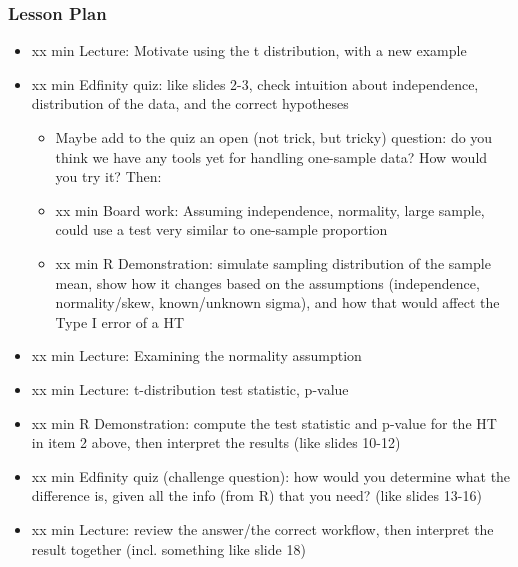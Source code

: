 \begin{frame}
    \frametitle{Lesson Plan}
    \begin{itemize}
        \item xx min Lecture: Motivate using the t distribution, with a new example
        \item xx min Edfinity quiz: like slides 2-3, check intuition about independence, distribution of the data, and the correct hypotheses
        \begin{itemize} 
            \item Maybe add to the quiz an open (not trick, but tricky) question: do you think we have any tools yet for handling one-sample data? How would you try it? Then:
            \item xx min Board work: Assuming independence, normality, large sample, could use a test very similar to one-sample proportion
            \item xx min R Demonstration: simulate sampling distribution of the sample mean, show how it changes based on the assumptions (independence, normality/skew, known/unknown sigma), and how that would affect the Type I error of a HT
        \end{itemize}
        \item xx min Lecture: Examining the normality assumption
        \item xx min Lecture: t-distribution test statistic, p-value
        \item xx min R Demonstration: compute the test statistic and p-value for the HT in item 2 above, then interpret the results (like slides 10-12)
        \item xx min Edfinity quiz (challenge question): how would you determine what the difference is, given all the info (from R) that you need? (like slides 13-16)
        \item xx min Lecture: review the answer/the correct workflow, then interpret the result together (incl. something like slide 18)
    \end{itemize}
\end{frame}
            

